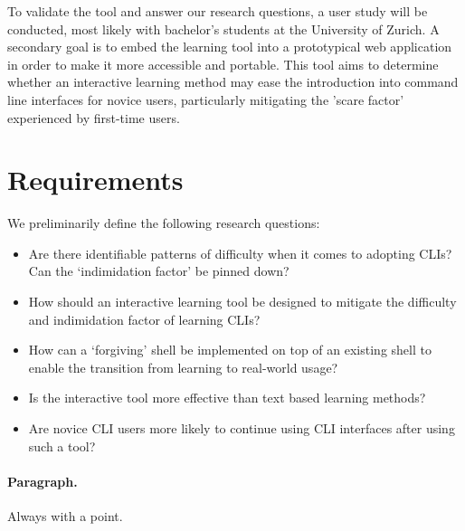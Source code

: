 To validate the tool and answer our
research questions, a user study will be conducted, most likely with bachelor's
students at the University of Zurich. A secondary goal is to embed the learning
tool into a prototypical web application in order to make it more accessible
and portable. This tool aims to determine whether an interactive learning
method may ease the introduction into command line interfaces for novice users,
particularly mitigating the 'scare factor' experienced by first-time users.

\section{Requirements}


We preliminarily define the following research questions:

\begin{itemize}
    \item Are there identifiable patterns of difficulty when it
          comes to adopting CLIs? Can the `indimidation factor' be pinned down?
    \item How should an interactive learning tool be designed to mitigate
          the difficulty and indimidation factor of learning CLIs?
    \item How can a `forgiving' shell be implemented on top of an existing
          shell to enable the transition from learning to real-world usage?
    \item Is the interactive tool more effective than text based learning methods?
    \item Are novice CLI users more likely to continue
          using CLI interfaces after using such a tool?
\end{itemize}
\paragraph{Paragraph.} Always with a point.

